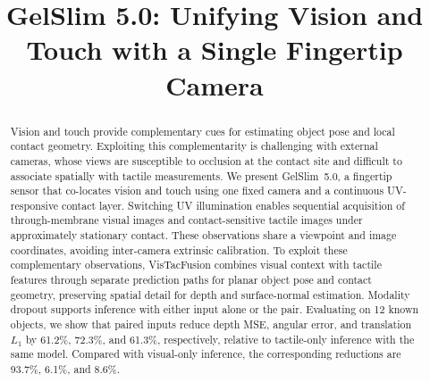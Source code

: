 \documentclass[letterpaper,10pt,conference]{ieeeconf}
\title{\LARGE\bf GelSlim 5.0: Unifying Vision and Touch with a Single Fingertip Camera}
\author{}
\newcommand{\sensor}{GelSlim~5.0}
\newcommand{\method}{VisTacFusion}
\begin{document}
\maketitle
\thispagestyle{empty}\pagestyle{empty}\raggedbottom
\begin{abstract}
Vision and touch provide complementary cues for estimating object pose and local contact geometry.
Exploiting this complementarity is challenging with external cameras, whose views are susceptible to occlusion at the contact site and difficult to associate spatially with tactile measurements.
%
We present \sensor{}, a fingertip sensor that co-locates vision and touch using one fixed camera and a continuous UV-responsive contact layer.
%
Switching UV illumination enables sequential acquisition of through-membrane visual images and contact-sensitive tactile images under approximately stationary contact.
These observations share a viewpoint and image coordinates, avoiding inter-camera extrinsic calibration.
%
To exploit these complementary observations, \method{} combines visual context with tactile features through separate prediction paths for planar object pose and contact geometry, preserving spatial detail for depth and surface-normal estimation.
%
Modality dropout supports inference with either input alone or the pair. Evaluating on 12 known objects, we show that paired inputs reduce depth MSE, angular error, and translation $L_1$ by 61.2\%, 72.3\%, and 61.3\%, respectively, relative to tactile-only inference with the same model.
Compared with visual-only inference, the corresponding reductions are 93.7\%, 6.1\%, and 8.6\%.
\end{abstract}
\end{document}
